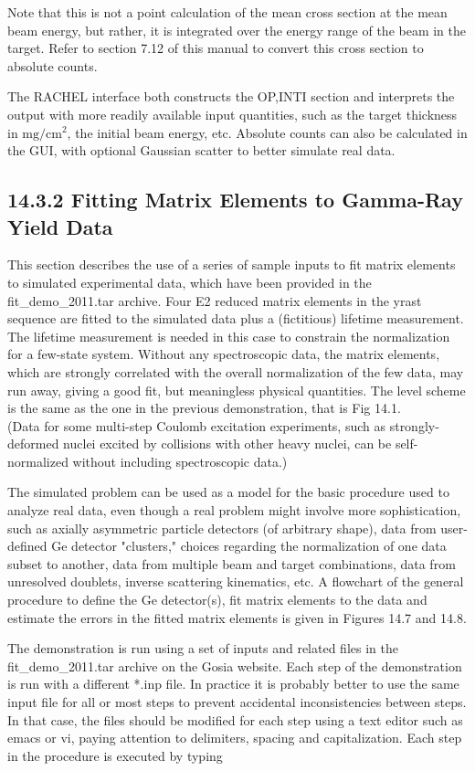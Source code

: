 \documentclass[10pt]{article}
\begin{document}
Note that this is not a point calculation of the mean cross section at the mean beam energy, but rather, it is integrated over the energy range of the beam in the target. Refer to section 7.12 of this manual to convert this cross section to absolute counts.

The RACHEL interface both constructs the OP,INTI section and interprets the output with more readily available input quantities, such as the target thickness in $\mathrm{mg} / \mathrm{cm}^{2}$, the initial beam energy, etc. Absolute counts can also be calculated in the GUI, with optional Gaussian scatter to better simulate real data.

\subsection*{14.3.2 Fitting Matrix Elements to Gamma-Ray Yield Data}
This section describes the use of a series of sample inputs to fit matrix elements to simulated experimental data, which have been provided in the fit\_demo\_2011.tar archive. Four E2 reduced matrix elements in the yrast sequence are fitted to the simulated data plus a (fictitious) lifetime measurement. The lifetime measurement is needed in this case to constrain the normalization for a few-state system. Without any spectroscopic data, the matrix elements, which are strongly correlated with the overall normalization of the few data, may run away, giving a good fit, but meaningless physical quantities. The level scheme is the same as the one in the previous demonstration, that is Fig 14.1.\\
(Data for some multi-step Coulomb excitation experiments, such as strongly-deformed nuclei excited by collisions with other heavy nuclei, can be self-normalized without including spectroscopic data.)

The simulated problem can be used as a model for the basic procedure used to analyze real data, even though a real problem might involve more sophistication, such as axially asymmetric particle detectors (of arbitrary shape), data from user-defined Ge detector "clusters," choices regarding the normalization of one data subset to another, data from multiple beam and target combinations, data from unresolved doublets, inverse scattering kinematics, etc. A flowchart of the general procedure to define the Ge detector(s), fit matrix elements to the data and estimate the errors in the fitted matrix elements is given in Figures 14.7 and 14.8.

The demonstration is run using a set of inputs and related files in the fit\_demo\_2011.tar archive on the Gosia website. Each step of the demonstration is run with a different *.inp file. In practice it is probably better to use the same input file for all or most steps to prevent accidental inconsistencies between steps. In that case, the files should be modified for each step using a text editor such as emacs or vi, paying attention to delimiters, spacing and capitalization. Each step in the procedure is executed by typing
\end{document}
